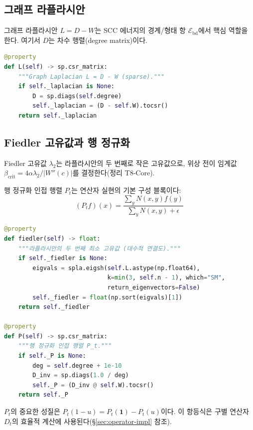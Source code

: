 \subsection{그래프 라플라시안}

그래프 라플라시안 $L = D - W$는 SCC 에너지의 경계/형태 항 $\mathcal{E}_{\mathrm{bd}}$에서 핵심 역할을 한다. 여기서 $D$는 차수 행렬(degree matrix)이다.

\begin{lstlisting}[language=Python, caption={라플라시안 계산 (graph.py)}]
@property
def L(self) -> sp.csr_matrix:
    """Graph Laplacian L = D - W (sparse)."""
    if self._laplacian is None:
        D = sp.diags(self.degree)
        self._laplacian = (D - self.W).tocsr()
    return self._laplacian
\end{lstlisting}

\subsection{Fiedler 고유값과 행 정규화}

Fiedler 고유값 $\lambda_2$는 라플라시안의 두 번째로 작은 고유값으로, 위상 전이 임계값 $\beta_{\mathrm{crit}} = 4\alpha\lambda_2 / |W''(c)|$를 결정한다(정리 T8-Core).

행 정규화 인접 행렬 $P_t$는 연산자 실현의 기본 구성 블록이다:
\begin{equation}
    (P_t f)(x) = \frac{\sum_y N(x,y) f(y)}{\sum_y N(x,y) + \epsilon}
    \label{eq:row-norm}
\end{equation}

\begin{lstlisting}[language=Python, caption={Fiedler 고유값과 행 정규화 (graph.py)}]
@property
def fiedler(self) -> float:
    """라플라시안의 두 번째 최소 고유값 (대수적 연결도)."""
    if self._fiedler is None:
        eigvals = spla.eigsh(self.L.astype(np.float64),
                             k=min(3, self.n - 1), which="SM",
                             return_eigenvectors=False)
        self._fiedler = float(np.sort(eigvals)[1])
    return self._fiedler

@property
def P(self) -> sp.csr_matrix:
    """행 정규화 인접 행렬 P_t."""
    if self._P is None:
        deg = self.degree + 1e-10
        D_inv = sp.diags(1.0 / deg)
        self._P = (D_inv @ self.W).tocsr()
    return self._P
\end{lstlisting}

$P_t$의 중요한 성질은 $P_t(1 - u) = P_t(\mathbf{1}) - P_t(u)$이다. 이 항등식은 구별 연산자 $D_t$의 효율적 계산에 사용된다(\S\ref{sec:operator-impl} 참조).

